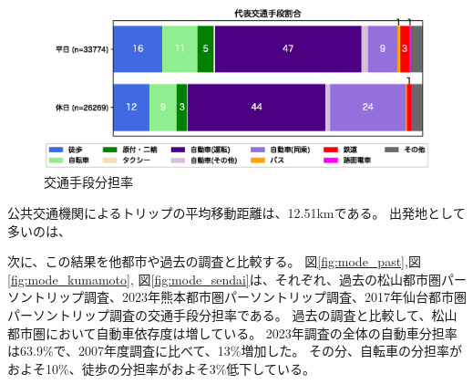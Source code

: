 \documentclass[a4paper,12pt, uplatex]{jsbook}
\begin{document}
\begin{figure}[htbp]
    \centering
    \includegraphics[width=1.0\textwidth]{picture/mode_share_day.eps}
    \caption{交通手段分担率}
    \label{fig:mode_share}
\end{figure}

公共交通機関によるトリップの平均移動距離は、12.51kmである。
出発地として多いのは、

次に、この結果を他都市や過去の調査と比較する。
図\ref{fig:mode_past},図\ref{fig:mode_kumamoto}, 図\ref{fig:mode_sendai}は、それぞれ、過去の松山都市圏パーソントリップ調査、2023年熊本都市圏パーソントリップ調査\cite{kumamoto}、2017年仙台都市圏パーソントリップ調査\cite{sendai}の交通手段分担率である。
過去の調査と比較して、松山都市圏において自動車依存度は増している。
2023年調査の全体の自動車分担率は63.9\%で、2007年度調査に比べて、13\%増加した。
その分、自転車の分担率がおよそ10\%、徒歩の分担率がおよそ3\%低下している。
\end{document}
